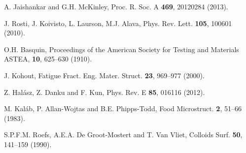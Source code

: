 \documentclass[twocolumn,superscriptaddress,showpacs,preprintnumbers,amsmath,amssymb,prl]{revtex4}
\begin{document}
\begin{thebibliography}{}
 A. Jaishankar and G.H. McKinley, Proc. R. Soc. A {\bf 469}, 20120284 (2013).

 J. Rosti, J. Koivisto, L. Laurson, M.J. Alava, Phys. Rev. Lett. {\bf 105}, 100601 (2010).

 O.H. Basquin, Proceedings of the American Society for Testing and Materials ASTEA, {\bf 10}, 625--630 (1910).

 J. Kohout, Fatigue Fract. Eng. Mater. Struct. {\bf 23}, 969--977 (2000).


 Z. Hal\'asz, Z. Danku and F. Kun, Phys. Rev. E {\bf 85}, 016116 (2012).

 M. Kal\'ab, P. Allan-Wojtas and B.E. Phipps-Todd, Food Microstruct. {\bf 2}, 51--66 (1983).

 S.P.F.M. Roefs, A.E.A. De Groot-Mostert and T. Van Vliet, Colloids Surf. {\bf 50}, 141--159 (1990).












\end{thebibliography}
\end{document}
